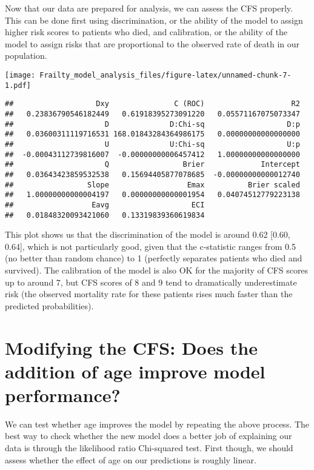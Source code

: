 \documentclass[
]{article}
\begin{document}
Now that our data are prepared for analysis, we can assess the CFS
properly. This can be done first using discrimination, or the ability of
the model to assign higher risk scores to patients who died, and
calibration, or the ability of the model to assign risks that are
proportional to the observed rate of death in our population.

\texttt{[image: Frailty\_model\_analysis\_files/figure-latex/unnamed-chunk-7-1.pdf]}

\begin{verbatim}
##                   Dxy               C (ROC)                    R2 
##   0.23836790546182449   0.61918395273091220   0.05571167075073347 
##                     D              D:Chi-sq                   D:p 
##   0.03600311119716531 168.01843284364986175   0.00000000000000000 
##                     U              U:Chi-sq                   U:p 
##  -0.00043112739816007  -0.00000000006457412   1.00000000000000000 
##                     Q                 Brier             Intercept 
##   0.03643423859532538   0.15694405877078685  -0.00000000000012740 
##                 Slope                  Emax          Brier scaled 
##   1.00000000000004197   0.00000000000001954   0.04074512779223138 
##                  Eavg                   ECI 
##   0.01848320093421060   0.13319839360619834
\end{verbatim}

This plot shows us that the discrimination of the model is around 0.62
{[}0.60, 0.64{]}, which is not particularly good, given that the
c-statistic ranges from 0.5 (no better than random chance) to 1
(perfectly separates patients who died and survived). The calibration of
the model is also OK for the majority of CFS scores up to around 7, but
CFS scores of 8 and 9 tend to dramatically underestimate risk (the
observed mortality rate for these patients rises much faster than the
predicted probabilities).

\hypertarget{modifying-the-cfs-does-the-addition-of-age-improve-model-performance}{%
\section{Modifying the CFS: Does the addition of age improve model
performance?}\label{modifying-the-cfs-does-the-addition-of-age-improve-model-performance}}

We can test whether age improves the model by repeating the above
process. The best way to check whether the new model does a better job
of explaining our data is through the likelihood ratio Chi-squared test.
First though, we should assess whether the effect of age on our
predictions is roughly linear.
\end{document}
